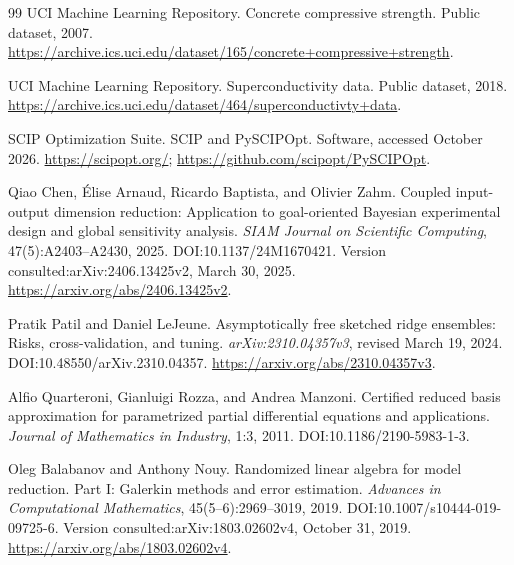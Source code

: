 \begin{thebibliography}{99}
UCI Machine Learning Repository.
\newblock Concrete compressive strength. Public dataset, 2007.
\newblock \url{https://archive.ics.uci.edu/dataset/165/concrete+compressive+strength}.

UCI Machine Learning Repository.
\newblock Superconductivity data. Public dataset, 2018.
\newblock \url{https://archive.ics.uci.edu/dataset/464/superconductivty+data}.

SCIP Optimization Suite.
\newblock SCIP and PySCIPOpt. Software, accessed October 2026.
\newblock \url{https://scipopt.org/}; \url{https://github.com/scipopt/PySCIPOpt}.

Qiao Chen, \'Elise Arnaud, Ricardo Baptista, and Olivier Zahm.
\newblock Coupled input-output dimension reduction: Application to goal-oriented Bayesian experimental design and global sensitivity analysis.
\newblock \emph{SIAM Journal on Scientific Computing}, 47(5):A2403--A2430, 2025.
\newblock DOI:10.1137/24M1670421. Version consulted:arXiv:2406.13425v2, March 30, 2025.
\newblock \url{https://arxiv.org/abs/2406.13425v2}.

Pratik Patil and Daniel LeJeune.
\newblock Asymptotically free sketched ridge ensembles: Risks, cross-validation, and tuning.
\newblock \emph{arXiv:2310.04357v3}, revised March 19, 2024.
\newblock DOI:10.48550/arXiv.2310.04357.
\newblock \url{https://arxiv.org/abs/2310.04357v3}.


Alfio Quarteroni, Gianluigi Rozza, and Andrea Manzoni.
\newblock Certified reduced basis approximation for parametrized partial differential equations and applications.
\newblock \emph{Journal of Mathematics in Industry}, 1:3, 2011.
\newblock DOI:10.1186/2190-5983-1-3.

Oleg Balabanov and Anthony Nouy.
\newblock Randomized linear algebra for model reduction. Part I: Galerkin methods and error estimation.
\newblock \emph{Advances in Computational Mathematics}, 45(5--6):2969--3019, 2019.
\newblock DOI:10.1007/s10444-019-09725-6. Version consulted:arXiv:1803.02602v4, October 31, 2019.
\newblock \url{https://arxiv.org/abs/1803.02602v4}.



\end{thebibliography}
